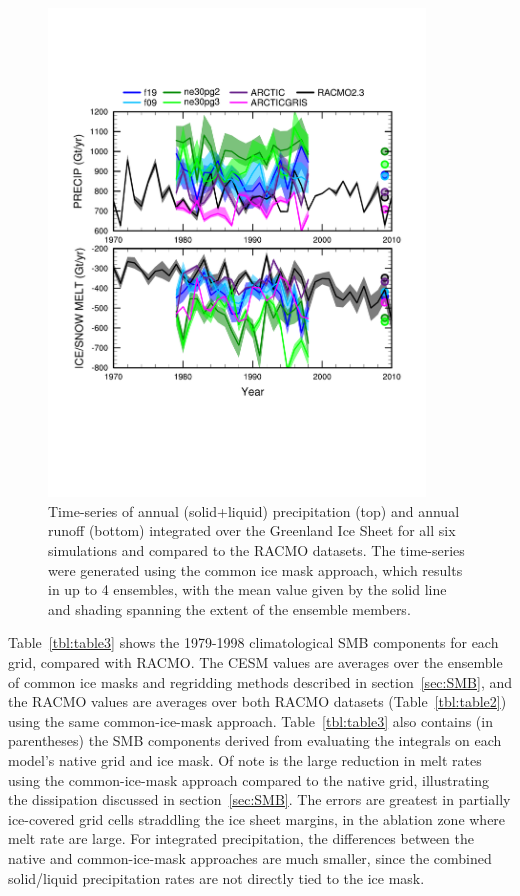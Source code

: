 \documentclass[draft]{agujournal2019}
\begin{document}
\begin{figure}[t]
\begin{center}
         \includegraphics[width=100mm]{figs/temp_tseries_GRIS.pdf}
\end{center}
\caption{Time-series of annual (solid+liquid) precipitation (top) and annual runoff (bottom) integrated over the Greenland Ice Sheet for all six simulations and compared to the RACMO datasets. The time-series were generated using the common ice mask approach, which results in up to 4 ensembles, with the mean value given by the solid line and shading spanning the extent of the ensemble members.}
\label{fig:tseries}
\end{figure}

Table~\ref{tbl:table3} shows the 1979-1998 climatological SMB components for each grid, compared with RACMO.
The CESM values are averages over the ensemble of common ice masks and regridding methods described in section~\ref{sec:SMB}, and the RACMO values are averages over both RACMO datasets (Table~\ref{tbl:table2}) using the same common-ice-mask approach. Table~\ref{tbl:table3} also contains (in parentheses) the SMB components derived from evaluating the integrals on each model's native grid and ice mask. Of note is the large reduction in melt rates using the common-ice-mask approach compared to the native grid, illustrating the dissipation discussed in section~\ref{sec:SMB}. The errors are greatest in partially ice-covered grid cells straddling the ice sheet margins, in the ablation zone where melt rate are large. For integrated precipitation, the differences between the native and common-ice-mask approaches are much smaller, since the combined solid/liquid precipitation rates are not directly tied to the ice mask.
\end{document}
